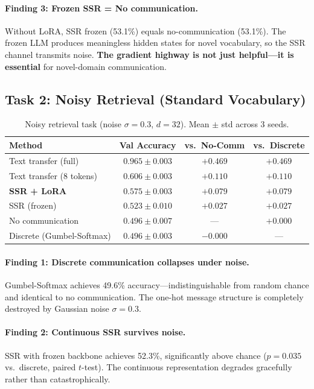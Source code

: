 \documentclass[11pt,a4paper]{article}
\begin{document}
\paragraph{Finding 3: Frozen SSR = No communication.}
Without LoRA, SSR frozen (53.1\%) equals no-communication (53.1\%). The frozen LLM produces meaningless hidden states for novel vocabulary, so the SSR channel transmits noise. \textbf{The gradient highway is not just helpful---it is essential} for novel-domain communication.

\subsection{Task 2: Noisy Retrieval (Standard Vocabulary)}

\begin{table}[h]
\centering
\caption{Noisy retrieval task (noise $\sigma{=}0.3$, $d{=}32$). Mean $\pm$ std across 3 seeds.}
\vspace{0.3em}
\begin{tabular}{@{}lccc@{}}
\toprule
\textbf{Method} & \textbf{Val Accuracy} & \textbf{vs.\ No-Comm} & \textbf{vs.\ Discrete} \\
\midrule
Text transfer (full)        & $0.965 \pm 0.003$ & $+0.469$ & $+0.469$ \\
Text transfer (8 tokens)    & $0.606 \pm 0.003$ & $+0.110$ & $+0.110$ \\
\textbf{SSR + LoRA}         & $\mathbf{0.575 \pm 0.003}$ & $\mathbf{+0.079}$ & $\mathbf{+0.079}$ \\
SSR (frozen)                & $0.523 \pm 0.010$ & $+0.027$ & $+0.027$ \\
No communication            & $0.496 \pm 0.007$ & --- & $+0.000$ \\
Discrete (Gumbel-Softmax)   & $0.496 \pm 0.003$ & $-0.000$ & --- \\
\bottomrule
\end{tabular}
\end{table}

\paragraph{Finding 1: Discrete communication collapses under noise.}
Gumbel-Softmax achieves 49.6\% accuracy---indistinguishable from random chance and identical to no communication. The one-hot message structure is completely destroyed by Gaussian noise $\sigma{=}0.3$.

\paragraph{Finding 2: Continuous SSR survives noise.}
SSR with frozen backbone achieves 52.3\%, significantly above chance ($p{=}0.035$ vs.\ discrete, paired $t$-test). The continuous representation degrades gracefully rather than catastrophically.
\end{document}
